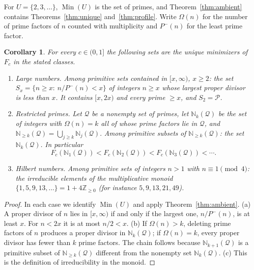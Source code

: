 \documentclass[11pt]{article}
\newtheorem{corollary}[theorem]{Corollary}
\theoremstyle{remark}
\newcommand{\N}{\mathbb{N}}
\newcommand{\Prm}{\mathcal{P}}
\begin{document}
For $U=\{2,3,\dots\}$, $\operatorname{Min}(U)$ is the set of primes, and
Theorem~\ref{thm:ambient} contains Theorems~\ref{thm:unique}
and~\ref{thm:profile}. Write $\Omega(n)$ for the number of prime factors
of $n$ counted with multiplicity and $P^-(n)$ for the least prime
factor.

\begin{corollary}\label{cor:ambient}
For every $c\in(0,1]$ the following sets are the unique minimizers of
$F_c$ in the stated classes.
\begin{enumerate}
\item[(a)] \emph{Large numbers.} Among primitive sets contained in
$[x,\infty)$, $x\ge2$: the set
$S_x=\{n\ge x:\ n/P^-(n)<x\}$ of integers $n\ge x$ whose largest proper
divisor is less than $x$. It contains $[x,2x)$ and every prime $\ge x$,
and $S_2=\Prm$.
\item[(b)] \emph{Restricted primes.} Let $\mathcal Q$ be a nonempty set
of primes, let $\N_k(\mathcal Q)$ be the set of integers with
$\Omega(n)=k$ all of whose prime factors lie in $\mathcal Q$, and
$\N_{\ge k}(\mathcal Q)=\bigcup_{j\ge k}\N_j(\mathcal Q)$. Among
primitive subsets of $\N_{\ge k}(\mathcal Q)$: the set
$\N_k(\mathcal Q)$. In particular
\[
  F_c(\N_1(\mathcal Q))<F_c(\N_2(\mathcal Q))<F_c(\N_3(\mathcal Q))<\cdots .
\]
\item[(c)] \emph{Hilbert numbers.} Among primitive sets of integers
$n>1$ with $n\equiv1\pmod4$: the irreducible elements of the
multiplicative monoid $\{1,5,9,13,\dots\}=1+4\mathbb Z_{\ge0}$ (for instance $5,9,13,21,49$).
\end{enumerate}
\end{corollary}

\begin{proof}
In each case we identify $\operatorname{Min}(U)$ and apply
Theorem~\ref{thm:ambient}. (a) A proper divisor of $n$ lies in
$[x,\infty)$ if and only if the largest one, $n/P^-(n)$, is at least
$x$. For $n<2x$ it is at most $n/2<x$. (b) If $\Omega(n)>k$, deleting
prime factors of $n$ produces a proper divisor in $\N_k(\mathcal Q)$; if
$\Omega(n)=k$, every proper divisor has fewer than $k$ prime factors. The
chain follows because $\N_{k+1}(\mathcal Q)$ is a primitive subset of
$\N_{\ge k}(\mathcal Q)$ different from the nonempty set
$\N_k(\mathcal Q)$. (c) This is the definition of irreducibility in the
monoid.
\end{proof}
\end{document}
